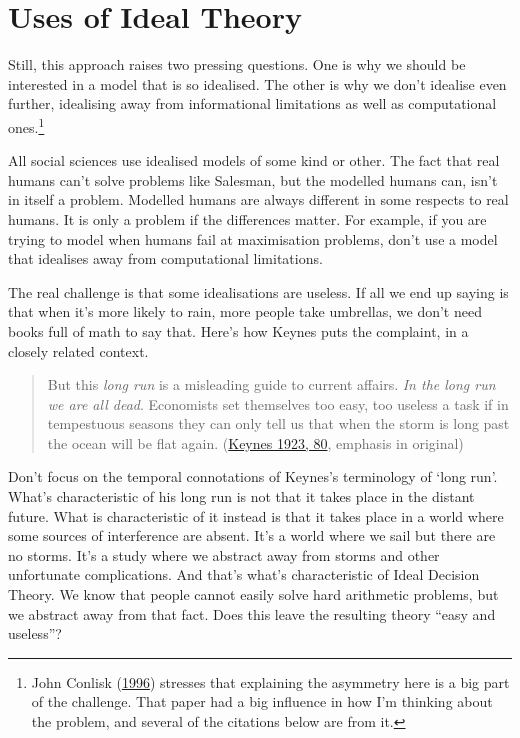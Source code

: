 \documentclass[
  12pt,
  letterpaper,
  DIV=11,
  numbers=noendperiod]{scrreprt}
\begin{document}
\hypertarget{sec-uses-ideal}{%
\section{Uses of Ideal Theory}\label{sec-uses-ideal}}

Still, this approach raises two pressing questions. One is why we should
be interested in a model that is so idealised. The other is why we don't
idealise even further, idealising away from informational limitations as
well as computational ones.\footnote{John Conlisk
  (\protect\hyperlink{ref-Conlisk1996}{1996}) stresses that explaining
  the asymmetry here is a big part of the challenge. That paper had a
  big influence in how I'm thinking about the problem, and several of
  the citations below are from it.}

All social sciences use idealised models of some kind or other. The fact
that real humans can't solve problems like Salesman, but the modelled
humans can, isn't in itself a problem. Modelled humans are always
different in some respects to real humans. It is only a problem if the
differences matter. For example, if you are trying to model when humans
fail at maximisation problems, don't use a model that idealises away
from computational limitations.

The real challenge is that some idealisations are useless. If all we end
up saying is that when it's more likely to rain, more people take
umbrellas, we don't need books full of math to say that. Here's how
Keynes puts the complaint, in a closely related context.

\begin{quote}
But this \emph{long run} is a misleading guide to current affairs.
\emph{In the long run we are all dead}. Economists set themselves too
easy, too useless a task if in tempestuous seasons they can only tell us
that when the storm is long past the ocean will be flat again.
(\protect\hyperlink{ref-Keynes1923}{Keynes 1923, 80}, emphasis in
original)
\end{quote}

Don't focus on the temporal connotations of Keynes's terminology of
`long run'. What's characteristic of his long run is not that it takes
place in the distant future. What is characteristic of it instead is
that it takes place in a world where some sources of interference are
absent. It's a world where we sail but there are no storms. It's a study
where we abstract away from storms and other unfortunate complications.
And that's what's characteristic of Ideal Decision Theory. We know that
people cannot easily solve hard arithmetic problems, but we abstract
away from that fact. Does this leave the resulting theory ``easy and
useless''?
\end{document}
